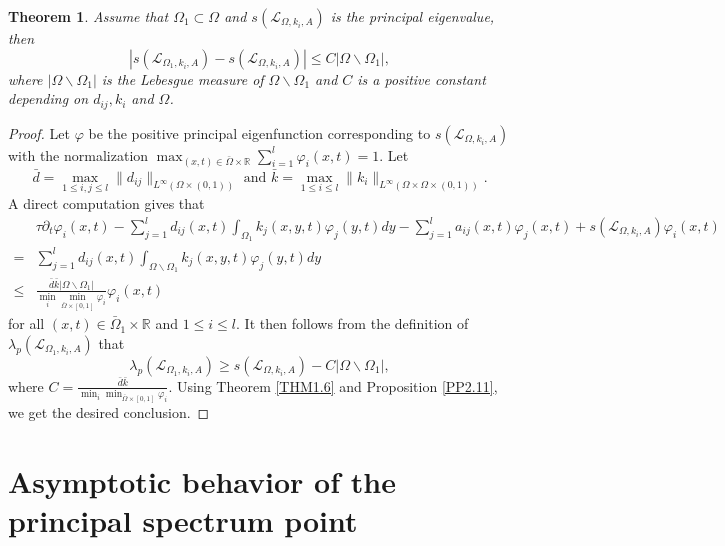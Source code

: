 \documentclass[11pt,reqno]{amsart}
\newtheorem{theorem}{Theorem}[section]
\numberwithin{equation}{section}
\begin{document}
\begin{theorem}
Assume that $\Omega_{1}\subset\Omega$ and $s(\mathcal{L}_{\Omega,k_{i},A})$ is the principal eigenvalue, then
\begin{equation*}
| s(\mathcal{L}_{\Omega_{1}, k_{i}, A}) -  s(\mathcal{L}_{\Omega, k_{i}, A})| \leq C|\Omega \backslash \Omega_{1}|,
\end{equation*}
where $|\Omega \backslash \Omega_{1}|$  is the Lebesgue measure of $\Omega \backslash \Omega_{1}$ and $C$ is a positive constant depending on $d_{ij}, k_{i}$ and $\Omega$.
\end{theorem}
%
%
\begin{proof}
Let $\varphi$ be the positive principal eigenfunction corresponding to $s(\mathcal{L}_{\Omega,k_{i},A})$ with the normalization  $\max_{(x,t)\in\bar{\Omega}\times\mathbb{R}} \sum_{i=1}^{l} \varphi_{i}(x,t) =1$.
%
Let
$$\bar{d}=\max_{1\leq i,j\leq l} \|d_{ij} \|_{L^{\infty}(\Omega\times (0,1))} \text{ and } \bar{k}=\max_{1\leq i\leq l} \|k_{i} \|_{L^{\infty}(\Omega\times\Omega\times (0,1))}.$$
%
A direct computation gives that
\begin{align*}
&\tau\partial_{t}\varphi_{i}(x,t)-\sum_{j=1}^{l}d_{ij}(x,t)\int_{\Omega_{1}}k_{j}(x,y,t)\varphi_{j}(y,t)dy
-\sum_{j=1}^{l}a_{ij}(x,t)\varphi_{j}(x,t) + s(\mathcal{L}_{\Omega,k_{i},A})\varphi_{i}(x,t)
\\
=& \sum_{j=1}^{l}d_{ij}(x,t)\int_{\Omega \backslash \Omega_{1}}k_{j}(x,y,t)\varphi_{j}(y,t)dy
\\
\leq&  \frac{  \bar{d} \bar{k} |\Omega\backslash\Omega_{1}|}{\min_{ i } \min_{\bar{\Omega}\times[0,1]} \varphi_{i} }\varphi_{i}(x,t)
\end{align*}
for all $(x,t)\in\bar{\Omega}_{1} \times \mathbb{R}$ and $1\leq i \leq l$.
It then follows from the definition of $\lambda_{p}(\mathcal{L}_{\Omega_{1}, k_{i}, A})$
that
\begin{equation*}
\lambda_{p}(\mathcal{L}_{\Omega_{1}, k_{i}, A})
\geq
s(\mathcal{L}_{\Omega,k_{i},A}) - C|\Omega\backslash\Omega_{1}|,
\end{equation*}
where $C= \frac{ \bar{d} \bar{k} }{\min_{ i } \min_{\bar{\Omega}\times[0,1]} \varphi_{i}}$.
Using Theorem \ref{THM1.6} and Proposition \ref{PP2.11}, we get the desired conclusion.
\end{proof}




\section{Asymptotic behavior of the principal spectrum point}
\end{document}

